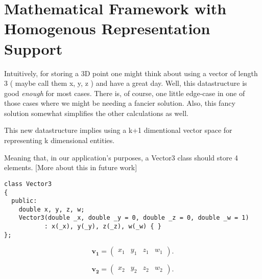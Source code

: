 
\section*{Mathematical Framework with Homogenous Representation Support}

Intuitively, for storing a 3D point one might think about using a vector of length 3 ( maybe call them x, y, z ) and have a great day.
Well, this datastructure is good \emph{enough} for most cases.
There is, of course, one little edge-case in one of those cases where we might be needing a fancier solution.
Also, this fancy solution somewhat simplifies the other calculations as well.


This new datastructure implies using a k+1 dimentional vector space for representing k dimensional entities. 

Meaning that, in our application's purposes, a Vector3 class should store 4 elements. [More about this in future work]


\begin{lstlisting}
class Vector3 
{
  public:
    double x, y, z, w;
    Vector3(double _x, double _y = 0, double _z = 0, double _w = 1) 
           : x(_x), y(_y), z(_z), w(_w) { }
};
\end{lstlisting}


\begin{equation*}
    \mathbf{v_1} = \begin{pmatrix} x_1 & y_1 & z_1 & w_1 \end{pmatrix}.
\end{equation*}

\begin{equation*}
    \mathbf{v_2} = \begin{pmatrix} x_2 & y_2 & z_2 & w_2 \end{pmatrix}.
\end{equation*}







